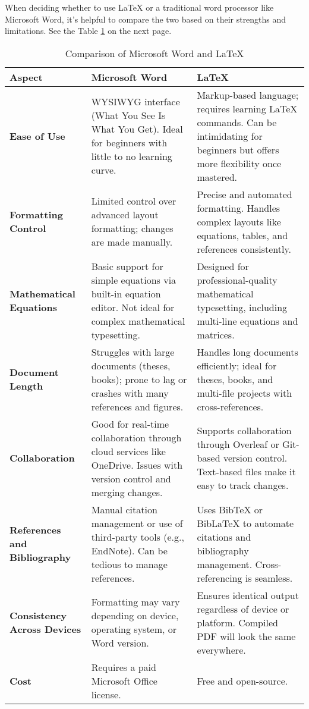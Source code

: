\documentclass[12pt, oneside]{article}
\begin{document}
When deciding whether to use \LaTeX{} or a traditional word processor like Microsoft Word, it’s helpful to compare the two based on their strengths and limitations. See the Table \ref{tab:comparison} on the next page.
\newpage
\begin{table}[h!]
\centering
\begin{tabular}{|p{4cm}|p{6cm}|p{6cm}|}
\hline
\textbf{Aspect} & \textbf{Microsoft Word} & \textbf{\LaTeX{}} \\ 
\hline
\textbf{Ease of Use} & 
WYSIWYG interface (What You See Is What You Get). 
Ideal for beginners with little to no learning curve. &
Markup-based language; requires learning \LaTeX{} commands. 
Can be intimidating for beginners but offers more flexibility once mastered. \\ 
\hline
\textbf{Formatting Control} & 
Limited control over advanced layout formatting; changes are made manually. &
Precise and automated formatting. Handles complex layouts like equations, tables, and references consistently. \\ 
\hline
\textbf{Mathematical Equations} & 
Basic support for simple equations via built-in equation editor. 
Not ideal for complex mathematical typesetting. &
Designed for professional-quality mathematical typesetting, including multi-line equations and matrices. \\ 
\hline
\textbf{Document Length} & 
Struggles with large documents (theses, books); prone to lag or crashes with many references and figures. & 
Handles long documents efficiently; ideal for theses, books, and multi-file projects with cross-references. \\ 
\hline
\textbf{Collaboration} & 
Good for real-time collaboration through cloud services like OneDrive. 
Issues with version control and merging changes. & 
Supports collaboration through Overleaf or Git-based version control. Text-based files make it easy to track changes. \\ 
\hline
\textbf{References and Bibliography} & 
Manual citation management or use of third-party tools (e.g., EndNote). 
Can be tedious to manage references. & 
Uses BibTeX or BibLaTeX to automate citations and bibliography management. Cross-referencing is seamless. \\ 
\hline
\textbf{Consistency Across Devices} & 
Formatting may vary depending on device, operating system, or Word version. &
Ensures identical output regardless of device or platform. Compiled PDF will look the same everywhere. \\ 
\hline
\textbf{Cost} & 
Requires a paid Microsoft Office license. &
Free and open-source. \\ 
\hline
\end{tabular}
\caption{Comparison of Microsoft Word and \LaTeX{}}
\label{tab:comparison}
\end{table}
\newpage
\end{document}
